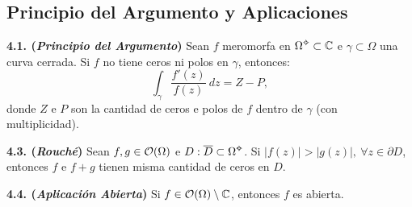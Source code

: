 
\subsection*{Principio del Argumento y Aplicaciones}

\begin{theorem}
    \textbf{4.1. (\emph{Principio del Argumento})} Sean \(f\) meromorfa en \(\Omega\ab\subset \C\) e \(\gamma \subset \Omega\) una curva cerrada. Si \(f\) no tiene ceros ni polos en \(\gamma\), entonces: %
    \[\int_{\gamma} \frac{f'(z)}{f(z)} \ dz = Z - P, \]
    donde \(Z\) e \(P\) son la cantidad de ceros e polos de \(f\) dentro de \(\gamma\) (con multiplicidad). 
\end{theorem}


\hypertarget{thm343}{}
\begin{theorem}
    \textbf{4.3. (\emph{Rouché})} Sean \(f, g \in \mathcal{O}(\Omega)\) e \(D : \overline{D} \subset \Omega\ab \). Si \(|f(z)| > |g(z)|, \ \forall z \in \partial D\), entonces \(f \) e \(f+g\) tienen misma cantidad de ceros en \(D\).
\end{theorem}


\hypertarget{thm344}{}
\begin{theorem}
    \textbf{4.4. (\emph{Aplicación Abierta})} Si \(f \in \mathcal{O}(\Omega)\setminus \mathbb{C}\), entonces \(f\) es abierta.
\end{theorem}


